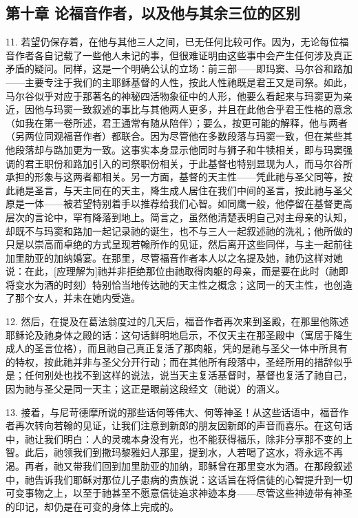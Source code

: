 
\subsection{第十章 论福音作者，以及他与其余三位的区别}

11. 若望仍保存着，在他与其他三人之间，已无任何比较可作。因为，无论每位福音作者各自记载了一些他人未记的事，但很难证明由这些事中会产生任何涉及真正矛盾的疑问。同样，这是一个明确公认的立场：前三部——即玛窦、马尔谷和路加——主要专注于我们的主耶稣基督的人性，按此人性祂既是君王又是司祭。如此，马尔谷似乎对应于那著名的神秘四活物象征中的人形，他要么看起来与玛窦更为亲近，因他与玛窦一致叙述的事比与其他两人更多，并且在此他合乎君王性格的意念（如我在第一卷所述，君王通常有随从陪伴）；要么，按更可能的解释，他与两者（另两位同观福音作者）都联合。因为尽管他在多数段落与玛窦一致，但在某些其他段落却与路加更为一致。这事实本身显示他同时与狮子和牛犊相关，即与玛窦强调的君王职份和路加引入的司祭职份相关，于此基督也特别显现为人，而马尔谷所承担的形象与这两者都相关。另一方面，基督的天主性——凭此祂与圣父同等，按此祂是圣言，与天主同在的天主，降生成人居住在我们中间的圣言，按此祂与圣父原是一体——被若望特别着手以推荐给我们心智。如同鹰一般，他停留在基督更高层次的言论中，罕有降落到地上。简言之，虽然他清楚表明自己对主母亲的认知，却既不与玛窦和路加一起记录祂的诞生，也不与三人一起叙述祂的洗礼；他所做的只是以崇高而卓绝的方式呈现若翰所作的见证，然后离开这些同伴，与主一起前往加里肋亚的加纳婚宴。在那里，尽管福音作者本人以之名提及她，祂仍这样对她说：在此，[应理解为]祂并非拒绝那位由祂取得肉躯的母亲，而是要在此时（祂即将变水为酒的时刻）特别恰当地传达祂的天主性之概念；这同一的天主性，也创造了那个女人，并未在她内受造。\par

12. 然后，在提及在葛法翁度过的几天后，福音作者再次来到圣殿，在那里他陈述耶稣论及祂身体之殿的话：这句话鲜明地启示，不仅天主在那圣殿中（寓居于降生成人的圣言位格），而且祂自己真正复活了那肉躯，凭的是祂与圣父一体中所具有的特权，按此祂并非与圣父分开行动；而在其他所有段落中，圣经所用的措辞似乎是；任何别处也找不到这样的说法，说当天主复活基督时，基督也复活了祂自己，因为祂与圣父是同一天主；这正是眼前这段经文（祂说）的涵义。\par

13. 接着，与尼苛德摩所说的那些话何等伟大、何等神圣！从这些话语中，福音作者再次转向若翰的见证，让我们注意到新郎的朋友因新郎的声音而喜乐。在这句话中，祂让我们明白：人的灵魂本身没有光，也不能获得福乐，除非分享那不变的上智。此后，祂领我们到撒玛黎雅妇人那里，提到水，人若喝了这水，将永远不再渴。再者，祂又带我们回到加里肋亚的加纳，耶稣曾在那里变水为酒。在那段叙述中，祂告诉我们耶稣对那位儿子患病的贵族说：这话旨在将信徒的心智提升到一切可变事物之上，以至于祂甚至不愿意信徒追求神迹本身——尽管这些神迹带有神圣的印记，却仍是在可变的身体上完成的。\par

